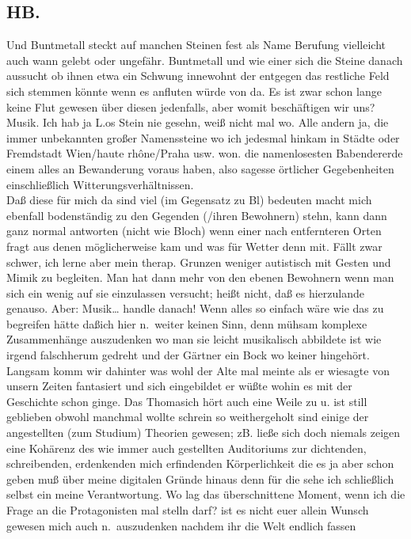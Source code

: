 \documentclass[
]{article}
\author{}
\date{\vspace{-2.5em}}
\begin{document}
\subsection{HB.}\label{hb.}

Und Buntmetall steckt auf manchen Steinen fest als Name Berufung
vielleicht auch wann gelebt oder ungefähr. Buntmetall und wie einer sich
die Steine danach aussucht ob ihnen etwa ein Schwung innewohnt der
entgegen das restliche Feld sich stemmen könnte wenn es anfluten würde
von da. Es ist zwar schon lange keine Flut gewesen über diesen
jedenfalls, aber womit beschäftigen wir uns? Musik. Ich hab ja L.os
Stein nie gesehn, weiß nicht mal wo. Alle andern ja, die immer
unbekannten großer Namenssteine wo ich jedesmal hinkam in Städte oder
Fremdstadt Wien/haute rhône/Praha usw. won. die namenlosesten
Babendererde einem alles an Bewanderung voraus haben, also sagesse
örtlicher Gegebenheiten einschließlich Witterungsverhältnissen.\\
Daß diese für mich da sind viel (im Gegensatz zu Bl) bedeuten macht mich
ebenfall bodenständig zu den Gegenden (/ihren Bewohnern) stehn, kann
dann ganz normal antworten (nicht wie Bloch) wenn einer nach
entfernteren Orten fragt aus denen möglicherweise kam und was für Wetter
denn mit. Fällt zwar schwer, ich lerne aber mein therap. Grunzen weniger
autistisch mit Gesten und Mimik zu begleiten. Man hat dann mehr von den
ebenen Bewohnern wenn man sich ein wenig auf sie einzulassen versucht;
heißt nicht, daß es hierzulande genauso. Aber: Musik\ldots{} handle
danach! Wenn alles so einfach wäre wie das zu begreifen hätte daßich
hier n.~weiter keinen Sinn, denn mühsam komplexe Zusammenhänge
auszudenken wo man sie leicht musikalisch abbildete ist wie irgend
falschherum gedreht und der Gärtner ein Bock wo keiner hingehört.
Langsam komm wir dahinter was wohl der Alte mal meinte als er wiesagte
von unsern Zeiten fantasiert und sich eingebildet er wüßte wohin es mit
der Geschichte schon ginge. Das Thomasich hört auch eine Weile zu u. ist
still geblieben obwohl manchmal wollte schrein so weithergeholt sind
einige der angestellten (zum Studium) Theorien gewesen; zB. ließe sich
doch niemals zeigen eine Kohärenz des wie immer auch gestellten
Auditoriums zur dichtenden, schreibenden, erdenkenden mich erfindenden
Körperlichkeit die es ja aber schon geben muß über meine digitalen
Gründe hinaus denn für die sehe ich schließlich selbst ein meine
Verantwortung. Wo lag das überschnittene Moment, wenn ich die Frage an
die Protagonisten mal stelln darf? ist es nicht euer allein Wunsch
gewesen mich auch n.~auszudenken nachdem ihr die Welt endlich fassen
\end{document}
